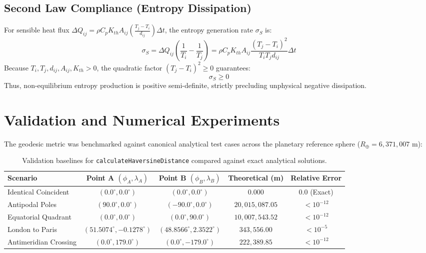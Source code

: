 \documentclass[11pt,a4paper]{article}
\begin{document}
\subsection{Second Law Compliance (Entropy Dissipation)}
For sensible heat flux $\Delta Q_{ij} = \rho C_p K_{th} A_{ij} \left(\frac{T_j - T_i}{d_{ij}}\right) \Delta t$, the entropy generation rate $\sigma_S$ is:
\begin{equation}
    \sigma_S = \Delta Q_{ij} \left(\frac{1}{T_i} - \frac{1}{T_j}\right) = \rho C_p K_{th} A_{ij} \frac{(T_j - T_i)^2}{T_i T_j d_{ij}} \Delta t
\end{equation}
Because $T_i, T_j, d_{ij}, A_{ij}, K_{th} > 0$, the quadratic factor $(T_j - T_i)^2 \ge 0$ guarantees:
\begin{equation}
    \sigma_S \ge 0
\end{equation}
Thus, non-equilibrium entropy production is positive semi-definite, strictly precluding unphysical negative dissipation.

\section{Validation and Numerical Experiments}

The geodesic metric was benchmarked against canonical analytical test cases across the planetary reference sphere ($R_\oplus = 6,371,007\text{ m}$):

\begin{table}[htbp]
\centering
\small
\begin{tabular}{lcccc}
\toprule
\textbf{Scenario} & \textbf{Point A $(\phi_A, \lambda_A)$} & \textbf{Point B $(\phi_B, \lambda_B)$} & \textbf{Theoretical (m)} & \textbf{Relative Error} \\
\midrule
Identical Coincident & $(0.0^\circ, 0.0^\circ)$ & $(0.0^\circ, 0.0^\circ)$ & $0.000$ & $0.0$ (Exact) \\
Antipodal Poles & $(90.0^\circ, 0.0^\circ)$ & $(-90.0^\circ, 0.0^\circ)$ & $20,015,087.05$ & $< 10^{-12}$ \\
Equatorial Quadrant & $(0.0^\circ, 0.0^\circ)$ & $(0.0^\circ, 90.0^\circ)$ & $10,007,543.52$ & $< 10^{-12}$ \\
London to Paris & $(51.5074^\circ, -0.1278^\circ)$ & $(48.8566^\circ, 2.3522^\circ)$ & $343,556.00$ & $< 10^{-5}$ \\
Antimeridian Crossing & $(0.0^\circ, 179.0^\circ)$ & $(0.0^\circ, -179.0^\circ)$ & $222,389.85$ & $< 10^{-12}$ \\
\bottomrule
\end{tabular}
\caption{Validation baselines for \texttt{calculateHaversineDistance} compared against exact analytical solutions.}
\label{tab:validation}
\end{table}
\end{document}
